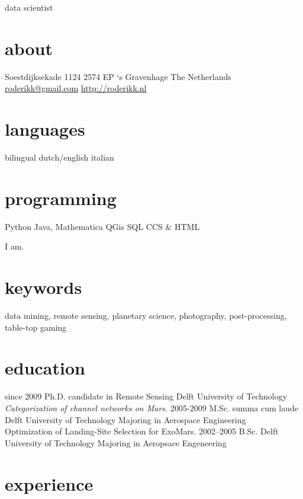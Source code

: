 \documentclass[]{friggeri-cv}
\begin{document}
       {data scientist}


\begin{aside}
  \section{about}
    Soestdijksekade 1124
    2574 EP `s Gravenhage
    The Netherlands
    ~
    \href{mailto:roderikk@gmail.com}{roderikk@gmail.com}
    \href{http://roderikk.nl}{http://roderikk.nl}
  \section{languages}
    bilingual dutch/english
    italian
  \section{programming}
    Python
    Java, Mathematica
    QGis
    SQL
    CCS \& HTML
\end{aside}

I am.

\section{keywords}

data mining,
remote sensing,
planetary science,
photography,
post-processing,
table-top gaming

\section{education}

\begin{entrylist}
  \entry
    {since 2009}
    {Ph.D. {\normalfont candidate in Remote Sensing}}
    {Delft University of Technology}
    {\emph{Categorization of channel networks on Mars.}}
  \entry
    {2005-2009}
    {M.Sc. summa cum laude}
    {Delft University of Technology}
    {Majoring in Aerospace Engineering\\
    Optimization of Landing-Site Selection for ExoMars.}
  \entry
    {2002–2005}
    {B.Sc.}
    {Delft University of Technology}
    {Majoring in Aeropsace Engeneering}
\end{entrylist}

\section{experience}
\end{document}
